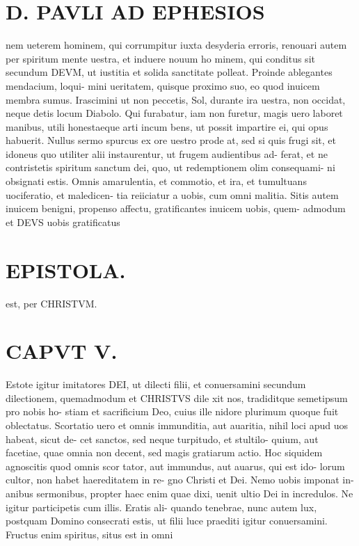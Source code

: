 \documentclass{article}
\begin{document}
\begin{pages}
\section*{D. PAVLI AD EPHESIOS }
\marginpar{[ p.8. ]}
\marginpar{[ p.9.  ]}
\marginpar{[ p.10.  ]}
\marginpar{[ p.11.  ]}
\marginpar{[ p.12.  ]}
\marginpar{[ p.13.  ]}\pstart nem ueterem hominem, qui corrumpitur iuxta desyderia erroris, renouari autem per spiritum mente uestra, et induere nouum ho minem, qui conditus sit secundum DEVM, ut iustitia et solida sanctitate polleat.  \pend\pstart Proinde ablegantes mendacium, loqui- mini ueritatem, quisque proximo suo, eo quod inuicem membra sumus.  \pend\pstart Irascimini ut non peccetis, Sol, durante ira uestra, non occidat, neque detis locum Diabolo.  \pend\pstart Qui furabatur, iam non furetur, magis uero laboret manibus, utili honestaeque  arti incum bens, ut possit impartire ei, qui opus habuerit.  \pend\pstart Nullus sermo spurcus ex ore uestro prode at, sed si quis frugi sit, et idoneus quo utiliter alii instaurentur, ut frugem audientibus ad- ferat, et ne contristetis spiritum sanctum dei, quo, ut redemptionem olim consequami- ni obsignati estis.  \pend\pstart Omnis amarulentia, et commotio, et ira, et tumultuans uociferatio, et maledicen- tia reiiciatur a uobis, cum omni malitia.  \pend\pstart Sitis autem inuicem benigni, propenso affectu, gratificantes inuicem uobis, quem- admodum et DEVS uobis gratificatus  \pend
\section*{EPISTOLA.  }
\marginpar{[ p.14 ]}
\marginpar{[ p.1.  ]}
\marginpar{[ p.2.  ]}
\marginpar{[ p.3.  ]}
\marginpar{[ p.4.  ]}
\marginpar{[ p.5.  ]}\pstart est, per CHRISTVM.   \pend
\endnumbering\beginnumbering\section{CAPVT V. }\pstart Estote igitur imitatores DEI, ut dilecti filii, et conuersamini secundum dilectionem, quemadmodum et CHRISTVS dile xit nos, tradiditque  semetipsum pro nobis ho- stiam et sacrificium Deo, cuius ille nidore plurimum quoque  fuit oblectatus.  \pend\pstart Scortatio uero et omnis immunditia, aut auaritia, nihil loci apud uos habeat, sicut de- cet sanctos, sed neque turpitudo, et stultilo- quium, aut facetiae, quae omnia non decent, sed magis gratiarum actio.  \pend\pstart Hoc siquidem agnoscitis quod omnis scor tator, aut immundus, aut auarus, qui est ido- lorum cultor, non habet haereditatem in re- gno Christi et Dei. Nemo uobis imponat in- anibus sermonibus, propter haec enim quae dixi, uenit ultio Dei in incredulos.  \pend\pstart Ne igitur participetis cum illis. Eratis ali- quando tenebrae, nunc autem lux, postquam Domino consecrati estis, ut filii luce praediti igitur conuersamini.  \pend\pstart Fructus enim spiritus, situs est in omni  \pend

\end{pages}
\end{document}

